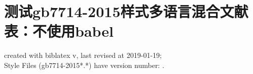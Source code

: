 \documentclass[twoside]{article}
\begin{document}
    \section{测试gb7714-2015样式多语言混合文献表：不使用babel}
    created with biblatex v\versionofbiblatex, last revised at 2019-01-19;\\ \hspace*{1.5em} Style Files (gb7714-2015*.*) have version number: \versionofgbtstyle.

	\nocite{*}

    \printbibliography

    
\end{document}
